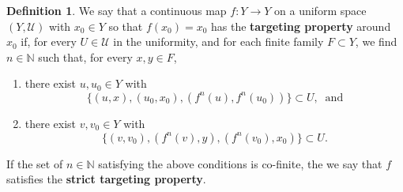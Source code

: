 \documentclass[12pt,english]{amsart}
\numberwithin{equation}{section}
\theoremstyle{plain}
\theoremstyle{definition}
\newtheorem{definition}[theorem]{Definition}
\def\NN{\mathbb N}
\begin{document}
\begin{definition}\label{def:targeting}
We say that a continuous map $f\colon Y\to Y$ on a uniform  space $(Y,\mathcal{U})$ with $x_0\in Y$ so that $f(x_0)=x_0$ has the \textbf{targeting property} around $x_0$ if, for every $U\in \mathcal{U}$ in the uniformity, and for each finite family $F\subset Y$, we find $n\in \NN$ such that, for every $x,y\in F$,  
\begin{enumerate}
\item[(i)]  there exist $u,u_0\in Y$ with 
\[
\{(u,x),(u_0,x_0),(f^n(u),f^n(u_0))\} \subset U, \ \mbox{ and}
\]
\item[(ii)] there exist $v,v_0\in Y$ with 
\[
\{(v,v_0),(f^n(v),y),(f^n(v_0),x_0)\} \subset U.  
\] 
\end{enumerate}
If the set of $n\in\NN$ satisfying the above conditions is co-finite, the we say that $f$ satisfies the \textbf{strict targeting property}. 
\end{definition}
\end{document}

